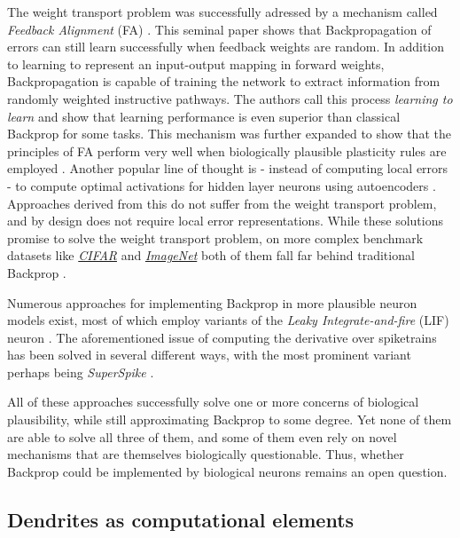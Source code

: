 The weight transport problem was successfully adressed by a mechanism called \textit{Feedback Alignment} (FA)
\citep{Lillicrap2014}. This seminal paper shows that Backpropagation of errors can still learn successfully when
feedback weights are random. In addition to learning to represent an input-output mapping in forward weights,
Backpropagation is capable of training the network to extract information from randomly weighted instructive pathways.
The authors call this process \textit{learning to learn} and show that learning performance is even superior than
classical Backprop for some tasks. This mechanism was further expanded to show that the principles of FA perform very
well when biologically plausible plasticity rules are employed \citep{Liao2016,Zenke2018}. Another popular line of
thought is - instead of computing local errors - to compute optimal activations for hidden layer neurons using
autoencoders \citep{Bengio2014,Lee2015,Ahmad2020}. Approaches derived from this do not suffer from the weight transport
problem, and by design does not require local error representations. While these solutions promise to solve the weight
transport problem, on more complex benchmark datasets like
\textit{\href{https://www.cs.toronto.edu/~kriz/cifar.html}{CIFAR}} and
\textit{\href{https://www.image-net.org/index.php}{ImageNet}} both of them fall far behind traditional Backprop
\citep{Bartunov2018}.

Numerous approaches for implementing Backprop in more plausible neuron models exist, most of which employ variants of
the \textit{Leaky Integrate-and-fire} (LIF) neuron \citep{Sporea2013,Lee2016,Bengio2017,Lee2020}. The aforementioned
issue of computing the derivative over spiketrains has been solved in several different ways, with the most prominent
variant perhaps being \textit{SuperSpike} \citep{Zenke2018}. \newline

All of these approaches successfully solve one or more concerns of biological plausibility, while still approximating
Backprop to some degree. Yet none of them are able to solve all three of them, and some of them even rely on novel
mechanisms that are themselves biologically questionable. Thus, whether Backprop could be implemented by biological
neurons remains an open question.

\subsection{Dendrites as computational elements}


